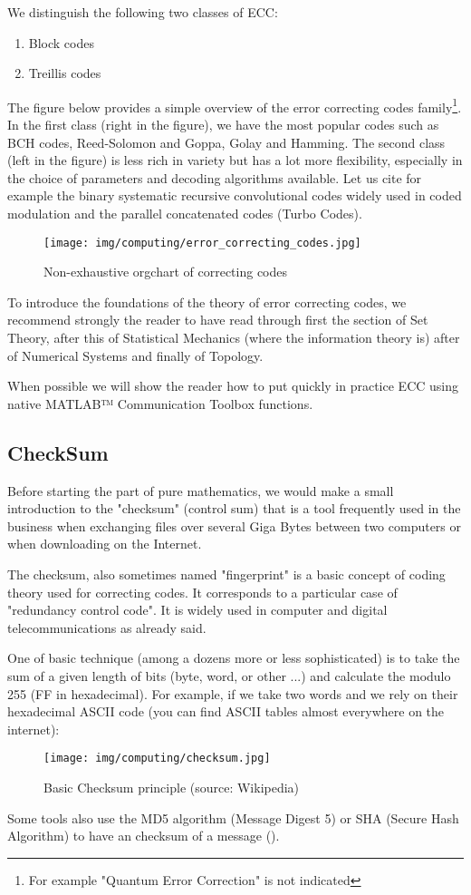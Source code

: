 	We distinguish the following two classes of ECC: 
	\begin{enumerate}
		\item Block codes
		\item Treillis codes
	\end{enumerate}
	The figure below provides a simple overview of the error correcting codes family\footnote{For example "Quantum Error Correction" is not indicated}. In the first class (right in the figure), we have the most popular codes such as BCH codes, Reed-Solomon and Goppa, Golay and Hamming. The second class (left in the figure) is less rich in variety but has a lot more flexibility, especially in the choice of parameters and decoding algorithms available. Let us cite for example the binary systematic recursive convolutional codes widely used in coded modulation and the parallel concatenated codes (Turbo Codes).
	\begin{figure}[H]
		\centering
		\texttt{[image: img/computing/error\_correcting\_codes.jpg]}
		\caption{Non-exhaustive orgchart of correcting codes}
	\end{figure}
	\begin{tcolorbox}[title=Remark,colframe=black,arc=10pt]
	To introduce the foundations of the theory of error correcting codes, we recommend strongly the reader to have read through first the section of Set Theory, after this of  Statistical Mechanics (where the information theory is) after of Numerical Systems and finally of Topology.
	\end{tcolorbox}
	
	When possible we will show the reader how to put quickly in practice ECC using native MATLAB™ Communication Toolbox functions.
	
	\subsection{CheckSum}
	Before starting the part of pure mathematics, we would make a small introduction to the "checksum" (control sum) that is a tool frequently used in the business when exchanging files over several Giga Bytes between two computers or when downloading on the Internet.
	
	The checksum, also sometimes named "fingerprint" is a basic concept of coding theory used for correcting codes. It corresponds to a particular case of "redundancy control code". It is widely used in computer and digital telecommunications as already said.
	
	One of basic technique (among a dozens more or less sophisticated) is to take the sum of a given length of bits (byte, word, or other ...) and calculate the modulo 255 (FF in hexadecimal). For example, if we take two words and we rely on their hexadecimal ASCII code (you can find ASCII tables almost everywhere on the internet):
	\begin{figure}[H]
		\centering
		\texttt{[image: img/computing/checksum.jpg]}
		\caption{Basic Checksum principle (source: Wikipedia)}
	\end{figure}
	Some tools also use the MD5 algorithm (Message Digest 5) or SHA (Secure Hash Algorithm) to have an checksum of a message ().
	
